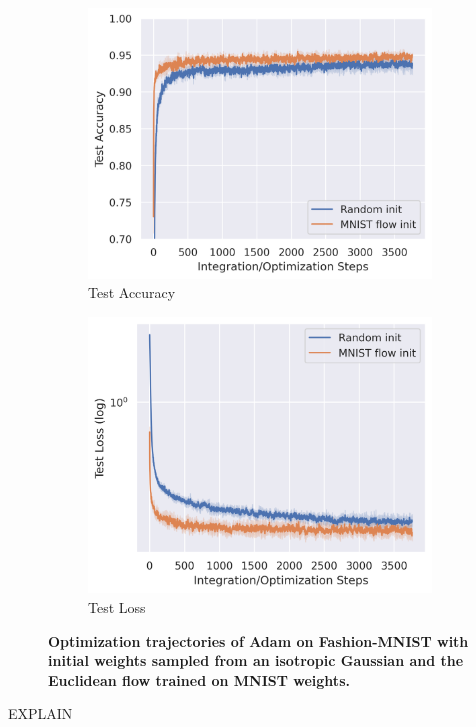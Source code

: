 \begin{figure}[h!]
    \centering
    \begin{subfigure}{0.47\linewidth}
        \centering
        \includegraphics[width=\linewidth]{figures/mnist/mnist_init_acc.png}
        \caption{Test Accuracy}
    \end{subfigure}
    \begin{subfigure}{0.47\linewidth}
        \centering
        \includegraphics[width=\linewidth]{figures/mnist/mnist_init_loss.png}
        \caption{Test Loss}
    \end{subfigure}
    \caption{\label{fig:mnist_init}\textbf{Optimization trajectories of Adam on Fashion-MNIST with initial weights sampled from an isotropic Gaussian and the Euclidean flow trained on MNIST weights.} } 
\end{figure}

{\color{red} EXPLAIN}


